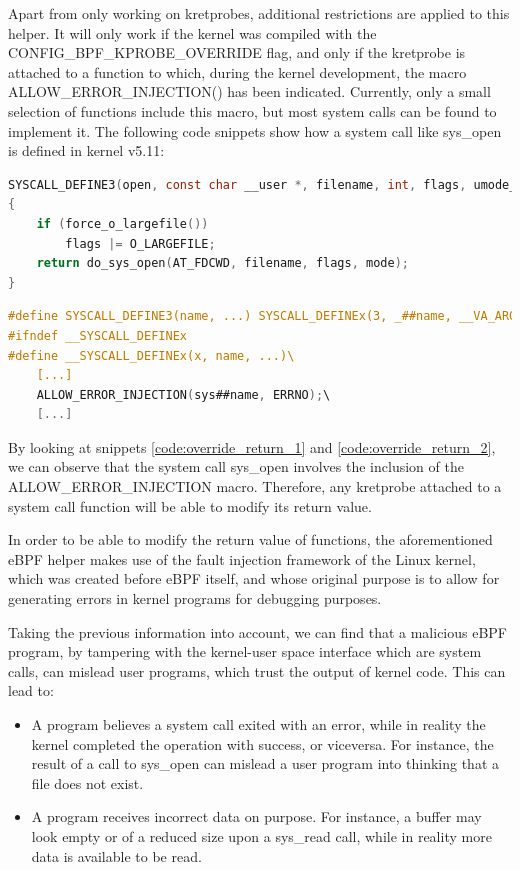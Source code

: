 \documentclass[12pt]{report} %
\begin{document}
Apart from only working on kretprobes, additional restrictions are applied to this helper. It will only work if the kernel was compiled with the CONFIG\_BPF\_KPROBE\_OVERRIDE flag, and only if the kretprobe is attached to a function to which, during the kernel development, the macro ALLOW\_ERROR\_INJECTION() has been indicated. Currently, only a small selection of functions include this macro, but most system calls can be found to implement it. The following code snippets show how a system call like sys\_open is defined in kernel v5.11:

\begin{lstlisting}[language=C, caption={Definition of the syscall sys\_open in the kernel \cite{code_kernel_open}}, label={code:override_return_1}]
SYSCALL_DEFINE3(open, const char __user *, filename, int, flags, umode_t, mode)
{
	if (force_o_largefile())
		flags |= O_LARGEFILE;
	return do_sys_open(AT_FDCWD, filename, flags, mode);
}
\end{lstlisting}

\begin{lstlisting}[language=C, caption={Definition of the macro for creating syscalls, containing the error injection macro. Only relevant instructions included, complete macro can be found in the kernel \cite{code_kernel_syscall}}, label={code:override_return_2}]
#define SYSCALL_DEFINE3(name, ...) SYSCALL_DEFINEx(3, _##name, __VA_ARGS__)
#ifndef __SYSCALL_DEFINEx
#define __SYSCALL_DEFINEx(x, name, ...)\
	[...]
	ALLOW_ERROR_INJECTION(sys##name, ERRNO);\
	[...]
\end{lstlisting}


By looking at snippets \ref{code:override_return_1} and \ref{code:override_return_2}, we can observe that the system call sys\_open involves the inclusion of the ALLOW\_ERROR\_INJECTION macro. Therefore, any kretprobe attached to a system call function will be able to modify its return value.

In order to be able to modify the return value of functions, the aforementioned eBPF helper makes use of the fault injection framework of the Linux kernel\cite{fault_injection}, which was created before eBPF itself, and whose original purpose is to allow for generating errors in kernel programs for debugging purposes.

Taking the previous information into account, we can find that a malicious eBPF program, by tampering with the kernel-user space interface which are system calls, can mislead user programs, which trust the output of kernel code. This can lead to:
\begin{itemize}
\item A program believes a system call exited with an error, while in reality the kernel completed the operation with success, or viceversa. For instance, the result of a call to sys\_open can mislead a user program into thinking that a file does not exist.
\item A program receives incorrect data on purpose. For instance, a buffer may look empty or of a reduced size upon a sys\_read call, while in reality more data is available to be read.
\end{itemize}
\end{document}
